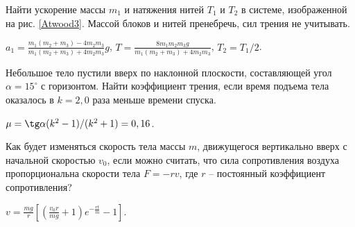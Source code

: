 \complexProblems

\begin{ex} %
Найти ускорение массы $m_1$ и натяжения нитей $T_1$ и $T_2$ в системе, изображенной на рис. \ref{Atwood3}. Массой блоков и нитей пренебречь, сил трения не учитывать.
\begin{ans}
$a_1 = \frac{m_1(m_2+m_3)-4m_2m_3}{m_1(m_2+m_3)+4m_2m_3}g$, $T= \frac{8m_1m_2m_3g}{m_1(m_2+m_3)+4m_2m_3}$, $T_2 = T_1/2$.
\end{ans}
\end{ex}

\begin{ex} %
Небольшое тело пустили вверх по наклонной плоскости, составляющей угол $\alpha  = 15^{\circ}$ с горизонтом. Найти коэффициент трения, если время подъема тела оказалось в $k = 2,0$ раза меньше времени спуска.
\begin{ans}
$\mu = \tg \alpha (k^2-1)/(k^2+1) = 0,16$.
\end{ans}
\end{ex}

\begin{ex} %
Как будет изменяться скорость тела массы $m$, движущегося вертикально вверх с начальной скоростью $v_0$, если можно считать, что сила сопротивления воздуха пропорциональна скорости тела $F = -rv$, где $r$ -- постоянный коэффициент сопротивления?
\begin{ans}
$v = \frac{mg}{r}\left[ \left( \frac{v_0r}{mg} +1 \right)e^{-\frac{rt}{m}} - 1 \right]$.
\end{ans}
\end{ex}

\clearpage